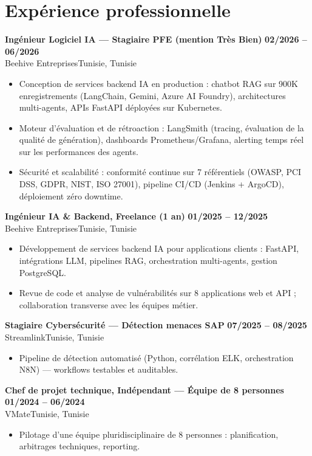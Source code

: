 \documentclass[a4paper,9pt]{article}
\newcommand{\cventry}[4]{\textbf{#1} \hfill \textbf{#4}\\[0.2pt]#2{\ifx\relax#3\relax\else, #3\fi}\par\vspace{0.3pt}}
\begin{document}
\section{Expérience professionnelle}
\cventry{Ingénieur Logiciel IA --- Stagiaire PFE (mention Très Bien)}{Beehive Entreprises}{Tunisie}{02/2026 -- 06/2026}
\begin{itemize}
  \item Conception de services backend IA en production : chatbot RAG sur 900K enregistrements (LangChain, Gemini, Azure AI Foundry), architectures multi-agents, APIs FastAPI déployées sur Kubernetes.
  \item Moteur d'évaluation et de rétroaction : LangSmith (tracing, évaluation de la qualité de génération), dashboards Prometheus/Grafana, alerting temps réel sur les performances des agents.
  \item Sécurité et scalabilité : conformité continue sur 7 référentiels (OWASP, PCI DSS, GDPR, NIST, ISO 27001), pipeline CI/CD (Jenkins + ArgoCD), déploiement zéro downtime.
\end{itemize}
\cventry{Ingénieur IA \& Backend, Freelance (1 an)}{Beehive Entreprises}{Tunisie}{01/2025 -- 12/2025}
\begin{itemize}
  \item Développement de services backend IA pour applications clients : FastAPI, intégrations LLM, pipelines RAG, orchestration multi-agents, gestion PostgreSQL.
  \item Revue de code et analyse de vulnérabilités sur 8 applications web et API ; collaboration transverse avec les équipes métier.
\end{itemize}
\cventry{Stagiaire Cybersécurité --- Détection menaces SAP}{Streamlink}{Tunisie}{07/2025 -- 08/2025}
\begin{itemize}
  \item Pipeline de détection automatisé (Python, corrélation ELK, orchestration N8N) --- workflows testables et auditables.
\end{itemize}
\cventry{Chef de projet technique, Indépendant --- Équipe de 8 personnes}{VMate}{Tunisie}{01/2024 -- 06/2024}
\begin{itemize}
  \item Pilotage d'une équipe pluridisciplinaire de 8 personnes : planification, arbitrages techniques, reporting.
\end{itemize}
\end{document}
